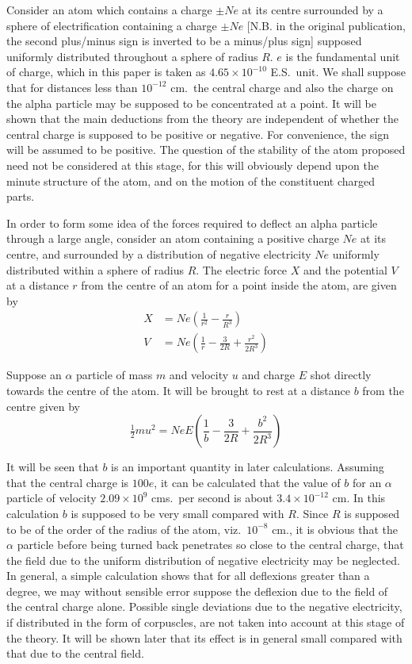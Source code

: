 \documentclass{article}
\begin{document}
\bigskip
Consider an atom which contains a charge $\pm Ne$ at its centre surrounded by a sphere of electrification containing
a charge $\pm Ne$
[N.B. in the original publication, the second plus/minus sign is inverted to be a minus/plus sign]
supposed uniformly distributed throughout a sphere of radius $R$.
$e$ is the fundamental unit of charge, which in this paper is taken as $4.65\times10^{-10}$ E.S.~unit.
We shall suppose that for distances less than $10^{-12}$ cm.~the central charge and also the charge on the alpha
particle may be supposed to be concentrated at a point.
It will be shown that the main deductions from the theory are independent of whether the central charge is supposed to be positive or negative.
For convenience, the sign will be assumed to be positive.
The question of the stability of the atom proposed need not be considered at this stage,
for this will obviously depend upon the minute structure of the atom,
and on the motion of the constituent charged parts.

\bigskip
In order to form some idea of the forces required to deflect an alpha particle through a large angle,
consider an atom containing a positive charge $Ne$ at its centre, and surrounded by a distribution of negative
electricity $Ne$ uniformly distributed within a sphere of radius $R$.
The electric force $X$ and the potential $V$ at a distance $r$ from the centre of an atom for a point inside the atom,
are given by
\begin{align*}
X&=Ne\left(\frac{1}{r^2}-\frac{r}{R^3}\right)
\\
V&=Ne\left(\frac{1}{r}-\frac{3}{2R}+\frac{r^2}{2R^3}\right)
\end{align*}

Suppose an $\alpha$ particle of mass $m$ and velocity $u$ and charge $E$ shot directly towards the centre of the atom.
It will be brought to rest at a distance $b$ from the centre given by
\begin{equation*}
\tfrac{1}{2}mu^2=NeE\left(\frac{1}{b}-\frac{3}{2R}+\frac{b^2}{2R^3}\right)
\end{equation*}

It will be seen that $b$ is an important quantity in later calculations.
Assuming that the central charge is $100e$, it can be calculated that the value of $b$ for an $\alpha$
particle of velocity $2.09\times10^9$ cms.~per second is about
$3.4\times10^{-12}$ cm.
In this calculation $b$ is supposed to be very small compared with $R$.
Since $R$ is supposed to be of the order of the radius of the atom, viz.~$10^{-8}$ cm.,
it is obvious that the $\alpha$ particle before being turned back penetrates so close to
the central charge, that the field due to the uniform distribution of negative electricity may be neglected.
In general, a simple calculation shows that for all deflexions greater than a degree,
we may without sensible error suppose the deflexion due to the field of the central charge alone.
Possible single deviations due to the negative electricity,
if distributed in the form of corpuscles, are not taken into account at this stage of the theory.
It will be shown later that its effect is in general small compared with that due to the central field.
\end{document}
